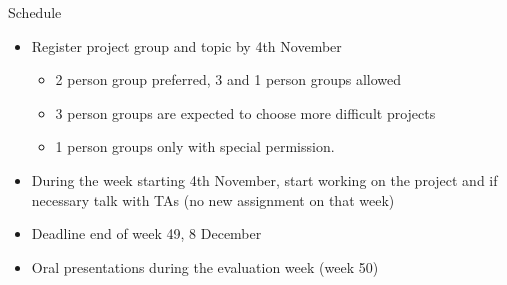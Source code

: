 \documentclass[t]{beamer}
\begin{document}
\begin{frame}
  
  {\Large\color{navyblue} Schedule}


  \begin{itemize}
  \item Register project group and topic by 4th November
    \begin{itemize}
    \item 2 person group preferred, 3 and 1 person groups allowed
    \item 3 person groups are expected to choose more difficult projects
    \item 1 person groups only with special permission.
    \end{itemize}
  \item During the week starting 4th November, start working on the
    project and if necessary talk with TAs (no new assignment on that
    week)
  \item Deadline end of week 49, 8 December
  \item Oral presentations during the evaluation week (week 50)
  \end{itemize}
  
\end{frame}
\end{document}
